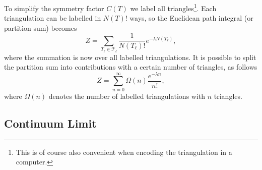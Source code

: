 To simplify the symmetry factor $C(T)$ we label all triangles\footnote{This is of course also convenient when encoding the triangulation in a computer.}. Each triangulation can be labelled in $N(T)!$ ways, so the Euclidean path integral (or partition sum) becomes
\begin{equation}
    Z
    =
    \sum_{T_\ell \in \mathcal{T}_\ell} \frac{1}{N(T_\ell)!} e^{- \lambda N(T_\ell)}
    ,
\end{equation}
where the summation is now over all labelled triangulations. It is possible to split the partition sum into contributions with a certain number of triangles, as follows
\begin{equation}\label{eq:part_sum}
    Z
    =
    \sum_{n = 0}^\infty \Omega(n) \frac{e^{- \lambda n}}{n!}
    ,
\end{equation}
where $\Omega(n)$ denotes the number of labelled triangulations with $n$ triangles.

\subsection{Continuum Limit}


